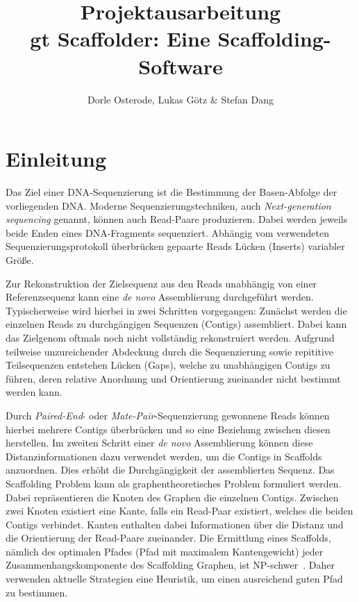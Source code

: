 \documentclass[a4paper,10pt,parskip]{scrartcl}
\title{Projektausarbeitung \\\vspace{.5cm} \large gt Scaffolder: Eine Scaffolding-Software}
\author{Dorle Osterode, Lukas Götz \& Stefan Dang}
\date{}
\begin{document}
\maketitle{}
\thispagestyle{empty}
\begin{abstract}
\end{abstract}

\newpage{}
\thispagestyle{empty}
\tableofcontents{}
\newpage{}
\setcounter{page}{1}
\section{Einleitung}

Das Ziel einer DNA-Sequenzierung ist die Bestimmung der Basen-Abfolge
der vorliegenden DNA. Moderne Sequenzierungstechniken, auch
\textit{Next-generation sequencing} genannt, können auch Read-Paare
produzieren. Dabei werden jeweils beide Enden eines DNA-Fragments
sequenziert. Abhängig vom verwendeten Sequenzierungsprotokoll
überbrücken gepaarte Reads Lücken (Inserts) variabler Größe.

Zur Rekonstruktion der Zielsequenz aus den Reads unabhängig von einer
Referenzsequenz kann eine \textit{de novo} Assemblierung durchgeführt
werden. Typischerweise wird hierbei in zwei Schritten vorgegangen:
Zunächst werden die einzelnen Reads zu durchgängigen Sequenzen
(Contigs) assembliert. Dabei kann das Zielgenom oftmals noch nicht
vollständig rekonstruiert werden. Aufgrund teilweise unzureichender
Abdeckung durch die Sequenzierung sowie repititive Teilsequenzen
entstehen Lücken (Gaps), welche zu unabhängigen Contigs zu führen,
deren relative Anordnung und Orientierung zueinander nicht bestimmt
werden kann.

Durch \textit{Paired-End}- oder \textit{Mate-Pair}-Sequenzierung
gewonnene Reads können hierbei mehrere Contigs überbrücken und so eine
Beziehung zwischen diesen herstellen. Im zweiten Schritt einer
\textit{de novo} Assemblierung können diese Distanzinformationen dazu
verwendet werden, um die Contigs in Scaffolds anzuordnen. Dies erhöht
die Durchgängigkeit der assemblierten Sequenz.  Das Scaffolding
Problem kann als graphentheoretisches Problem formuliert werden. Dabei
repräsentieren die Knoten des Graphen die einzelnen Contigs. Zwischen
zwei Knoten existiert eine Kante, falls ein Read-Paar existiert,
welches die beiden Contigs verbindet. Kanten enthalten dabei
Informationen über die Distanz und die Orientierung der Read-Paare
zueinander. Die Ermittlung eines Scaffolds, nämlich des optimalen
Pfades (Pfad mit maximalem Kantengewicht) jeder
Zusammenhangskomponente des Scaffolding Graphen, ist
NP-schwer~\cite{Huson:2002kf}. Daher verwenden aktuelle Strategien
eine Heuristik, um einen ausreichend guten Pfad zu bestimmen.
\end{document}
